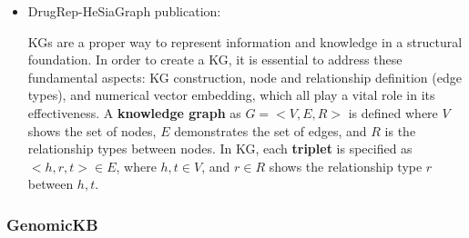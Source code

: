 \documentclass{article}
\begin{document}
\begin{itemize}

\item DrugRep-HeSiaGraph publication:
\begin{displayquote}
KGs are a proper way to represent information and knowledge in a structural foundation. In order to create a KG, it is essential to address these fundamental aspects: KG construction, node and relationship definition (edge types), and numerical vector embedding, which all play a vital role in its effectiveness. A \textbf{knowledge graph} as $ G = <V, E, R> $ is defined where $ V $ shows the set of nodes, $ E $ demonstrates the set of edges, and $ R $ is the relationship types between nodes. In KG, each \textbf{triplet} is specified as $ <h, r, t> \in E $, where $ h, t \in V $, and $ r \in R $ shows the relationship type $ r $ between $ h, t $.
\end{displayquote}

\end{itemize}


\subsubsection{GenomicKB}
\end{document}
